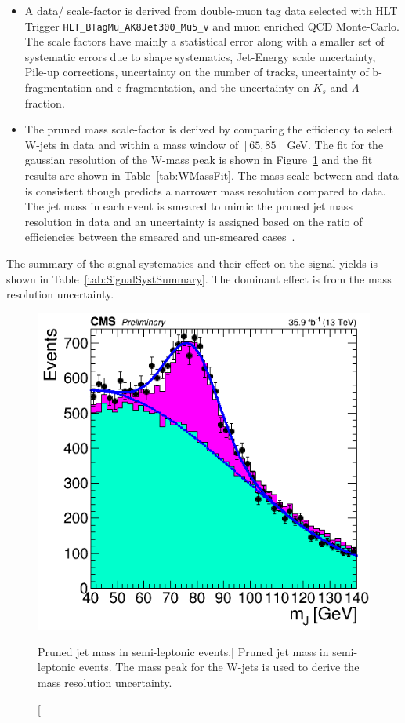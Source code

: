 \begin{itemize}
\item A data/ scale-factor is derived from double-muon tag data selected with HLT Trigger \texttt{HLT\_BTagMu\_AK8Jet300\_Mu5\_v} and muon enriched QCD Monte-Carlo. The scale factors have mainly a statistical error along with a smaller set of systematic errors due to shape systematics, Jet-Energy scale uncertainty, Pile-up corrections, uncertainty on the number of tracks, uncertainty of b-fragmentation and  c-fragmentation, and the uncertainty on $K_{s}$ and $\Lambda$ fraction. 
\item The pruned mass scale-factor is derived by comparing the efficiency to select W-jets in data and  within a mass window of $\left[65,85\right]$ GeV.  The fit for the gaussian resolution of the W-mass peak is shown in Figure~\ref{fig:WMassPeak} and the fit results are shown in Table~\ref{tab:WMassFit}. The mass scale between  and data is consistent though  predicts a narrower mass resolution compared to data. The jet mass in each event is smeared to mimic the pruned jet mass resolution in data and an uncertainty is assigned based on the ratio of efficiencies between the smeared and un-smeared cases~\cite{CMS_AN_2016-215}.
\end{itemize} 

The summary of the signal systematics and their effect on the signal yields is shown in Table~\ref{tab:SignalSystSummary}. The dominant effect is from the mass resolution uncertainty.

\begin{figure}
\begin{center}
\includegraphics[width=0.5\linewidth]{figs/WMassPeakDataMC.png}
\end{center}
\caption
[Pruned jet mass in semi-leptonic \ttbar events.]
{Pruned jet mass in semi-leptonic \ttbar events. The mass peak for the W-jets is used to derive the mass resolution uncertainty.}
\label{fig:WMassPeak}
\end{figure}

